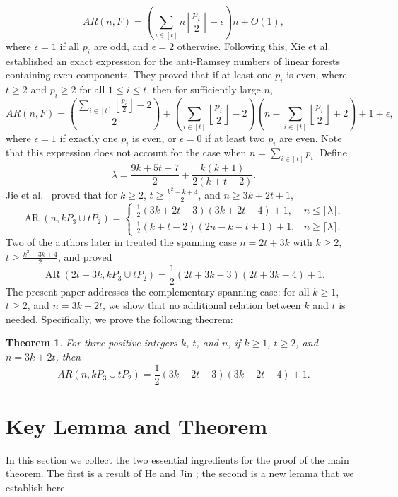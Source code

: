 \documentclass[12pt]{article}
\newtheorem{theorem}{Theorem}[section]
\begin{document}
\[
AR(n, F) = \left( \sum_{i \in [t]} n \left\lfloor \frac{p_i}{2} \right\rfloor - \epsilon \right) n + {O}(1),
\] 
where \( \epsilon = 1 \) if all \( p_i \) are odd, and \( \epsilon = 2 \) otherwise.
Following this, Xie et al. \cite{p1-14} established an exact expression for the anti-Ramsey numbers of linear forests containing even components. They proved that if at least one \( p_i \) is even, where \( t \geq 2 \) and \( p_i \geq 2 \) for all \( 1 \leq i \leq t \), then for sufficiently large \( n \), 
\[
AR(n, F) = \binom{\sum_{i \in [t]} \left\lfloor \frac{p_i}{2} \right\rfloor - 2}{2} + \left( \sum_{i \in [t]} \left\lfloor \frac{p_i}{2} \right\rfloor - 2 \right) \left( n - \sum_{i \in [t]} \left\lfloor \frac{p_i}{2} \right\rfloor + 2 \right) + 1 + \epsilon,
\]
where \( \epsilon = 1 \) if exactly one \( p_i \) is even, or \( \epsilon = 0 \) if at least two \( p_i \) are even. Note that this expression does not account for the case when \( n = \sum_{i \in [t]} p_i \).
Define
\[
\lambda = \frac{9k+5t-7}{2} + \frac{k(k+1)}{2(k+t-2)}.
\]
Jie et al.~\cite{p1-10} proved that for \(k\ge 2\), \(t\ge \frac{k^2-k+4}{2}\), and \(n\ge 3k+2t+1\),
\[
\operatorname{AR}(n,kP_3\cup tP_2)=
\begin{cases}
	\frac12(3k+2t-3)(3k+2t-4)+1, & n\le\lfloor\lambda\rfloor,\\[4pt]
	\frac12(k+t-2)(2n-k-t+1)+1, & n\ge\lceil\lambda\rceil.
\end{cases}
\]
Two of the authors later in \cite{new-1} treated  the spanning case \(n=2t+3k\) with \(k\ge 2\), \(t\ge \frac{k^2-3k+4}{2}\), and proved
\[
\operatorname{AR}(2t+3k,kP_3\cup tP_2)=\frac12(2t+3k-3)(2t+3k-4)+1.
\]
The present paper addresses the complementary spanning case: for all \(k\ge 1\), \(t\ge 2\), and \(n=3k+2t\), we show that no additional relation between \(k\) and \(t\) is needed. Specifically, we prove the following theorem:
\begin{theorem}\label{th3}
For three positive integers \( k \), \( t \), and \( n \), if \( k \geq 1 \), \( t \geq 2 \), and \( n = 3k + 2t \), then
\[
AR(n, kP_3 \cup tP_2) = \frac{1}{2} (3k + 2t - 3)(3k + 2t - 4) + 1.
\]
\end{theorem}

\section{Key Lemma and Theorem}
In this section we collect the two essential ingredients for the proof of the main theorem. The first is a result of He and Jin \cite{p1-8}; the second is a new lemma that we establish here.
\end{document}
